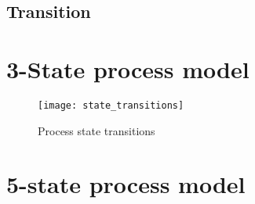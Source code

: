 \subsection{Transition}


\section{3-State process model}

\begin{figure}[htbp]
  \centering
  \texttt{[image: state\_transitions]}
  \caption{Process state transitions}
  \label{fig:process-state-transitions}
\end{figure}


\section{5-state process model}